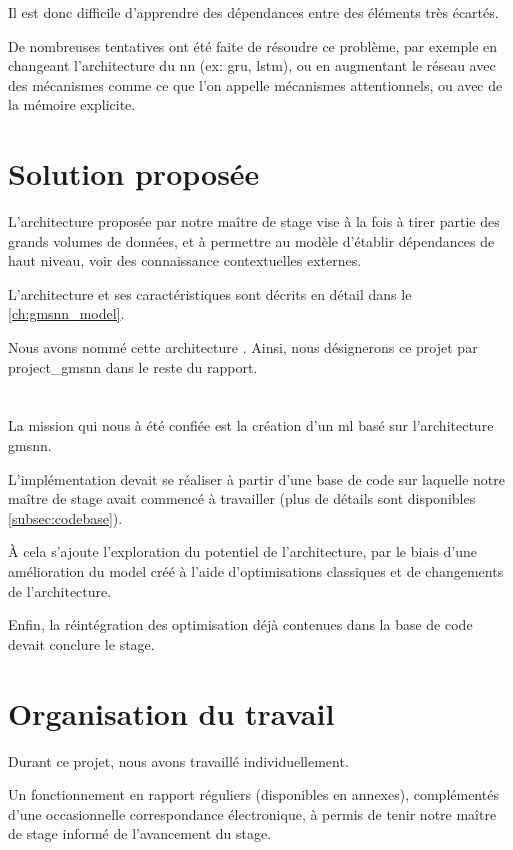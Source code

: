 Il est donc difficile d'apprendre des dépendances entre des éléments très écartés.

De nombreuses tentatives ont été faite de résoudre ce problème, par exemple en changeant l'architecture du \gls{nn} (ex: \gls{gru}, \gls{lstm}), ou en augmentant le réseau avec des mécanismes comme ce que l'on appelle mécanismes attentionnels, ou avec de la mémoire explicite.

\section{Solution proposée}
L'architecture proposée par notre maître de stage vise à la fois à tirer partie des grands volumes de données, et à permettre au modèle d'établir dépendances de haut niveau, voir des connaissance contextuelles externes.

L'architecture et ses caractéristiques sont décrits en détail dans le \autoref{ch:gmsnn_model}.

Nous avons nommé cette architecture .
Ainsi, nous désignerons ce projet par \og \gls{project_gmsnn}\fg{} dans le reste du rapport.

\section{}
La mission qui nous à été confiée est la création d'un \gls{ml} basé sur l'architecture \gls{gmsnn}.

L'implémentation devait se réaliser à partir d'une base de code sur laquelle notre maître de stage avait commencé à travailler (plus de détails sont disponibles \autoref{subsec:codebase}).

À cela s'ajoute l'exploration du potentiel de l'architecture, par le biais d'une amélioration du \gls{model} créé à l'aide d'optimisations classiques et de changements de l'architecture.

Enfin, la réintégration des optimisation déjà contenues dans la base de code devait conclure le stage.

\section{Organisation du travail}
Durant ce projet, nous avons travaillé individuellement.

Un fonctionnement en rapport réguliers (disponibles en annexes), complémentés d'une occasionnelle correspondance électronique, à permis de tenir notre maître de stage informé de l'avancement du stage.

